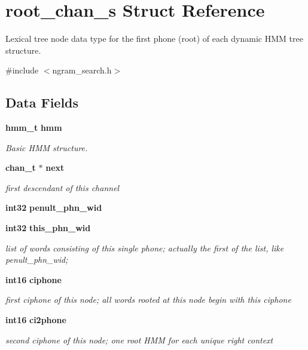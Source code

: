 \section{root\-\_\-chan\-\_\-s \-Struct \-Reference}
\label{structroot__chan__s}


\-Lexical tree node data type for the first phone (root) of each dynamic \-H\-M\-M tree structure.  




{\ttfamily \#include $<$ngram\-\_\-search.\-h$>$}

\subsection*{\-Data \-Fields}
\begin{DoxyCompactItemize}
\item 
{\bf hmm\-\_\-t} {\bf hmm}
\begin{DoxyCompactList}\small\item\em \-Basic \-H\-M\-M structure. \end{DoxyCompactList}\item 
{\bf chan\-\_\-t} $\ast$ {\bf next}\label{structroot__chan__s_ae0f0b90a7cb2fcb54cd7b30502dd497e}

\begin{DoxyCompactList}\small\item\em first descendant of this channel \end{DoxyCompactList}\item 
{\bf int32} {\bfseries penult\-\_\-phn\-\_\-wid}\label{structroot__chan__s_a9a0db0131f3965ae2eb7dab7e84fc04d}

\item 
{\bf int32} {\bf this\-\_\-phn\-\_\-wid}
\begin{DoxyCompactList}\small\item\em list of words consisting of this single phone; actually the first of the list, like penult\-\_\-phn\-\_\-wid; \end{DoxyCompactList}\item 
{\bf int16} {\bf ciphone}\label{structroot__chan__s_ad67c37bf4183f518acd7760c09a806f6}

\begin{DoxyCompactList}\small\item\em first ciphone of this node; all words rooted at this node begin with this ciphone \end{DoxyCompactList}\item 
{\bf int16} {\bf ci2phone}\label{structroot__chan__s_a0c0cf22caf4c97879af86865764f1675}

\begin{DoxyCompactList}\small\item\em second ciphone of this node; one root \-H\-M\-M for each unique right context \end{DoxyCompactList}\end{DoxyCompactItemize}


